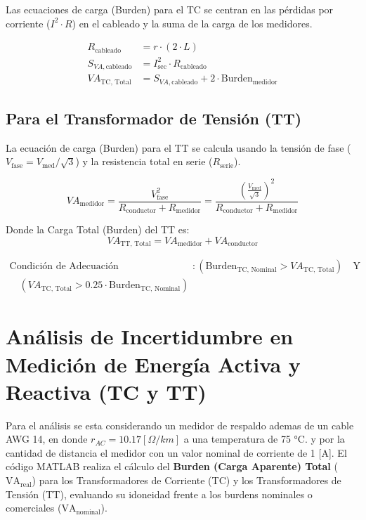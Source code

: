 Las ecuaciones de carga (Burden) para el TC se centran en las pérdidas por corriente ($I^2 \cdot R$) en el cableado y la suma de la carga de los medidores.

\begin{align*}
    R_{\text{cableado}} &= r \cdot (2 \cdot L) \\
    S_{VA, \text{cableado}} &= I_{\text{sec}}^{2} \cdot R_{\text{cableado}} \\
    VA_{\text{TC, Total}} &= S_{VA, \text{cableado}} + 2 \cdot \text{Burden}_{\text{medidor}}
\end{align*}

\vspace{0.5cm}

\subsection*{Para el Transformador de Tensión (TT)}

La ecuación de carga (Burden) para el TT se calcula usando la tensión de fase ($V_{\text{fase}} = V_{\text{med}} / \sqrt{3}$) y la resistencia total en serie ($R_{\text{serie}}$).

\begin{equation}
    VA_{\text{medidor}} = \frac{V_{\text{fase}}^{2}}{R_{\text{conductor}} + R_{\text{medidor}}} = \frac{\left(\frac{V_{\text{med}}}{\sqrt{3}}\right)^2}{R_{\text{conductor}} + R_{\text{medidor}}}
\end{equation}

Donde la Carga Total (Burden) del TT es:
$$ VA_{\text{TT, Total}} = VA_{\text{medidor}} + VA_{\text{conductor}} $$

\begin{align*}
    \text{Condición de Adecuación} &: \left( \text{Burden}_{\text{TC, Nominal}} > VA_{\text{TC, Total}} \right) \quad \text{Y} \\ \quad \left( VA_{\text{TC, Total}} > 0.25 \cdot \text{Burden}_{\text{TC, Nominal}} \right)
\end{align*}


\section{Análisis de Incertidumbre en Medición de Energía Activa y Reactiva (TC y TT)}
Para el análisis se esta considerando un medidor de respaldo ademas de un cable AWG 14, en donde $r_{AC}=10.17[\Omega/km]$ a una temperatura de 75 °C. y por la cantidad de distancia el medidor con un valor nominal de corriente de 1 [A].
El código MATLAB realiza el cálculo del \textbf{Burden (Carga Aparente) Total} ($\text{VA}_{\text{real}}$) para los Transformadores de Corriente (TC) y los Transformadores de Tensión (TT), evaluando su idoneidad frente a los burdens nominales o comerciales ($\text{VA}_{\text{nominal}}$).

